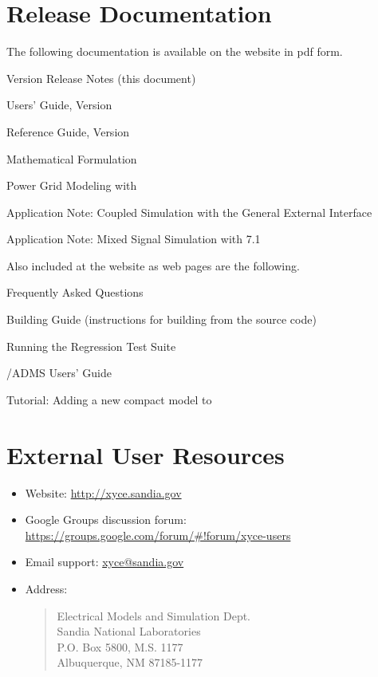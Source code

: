 \documentclass[letterpaper]{scrartcl}
\begin{document}
\section{\Xyce{} Release \XyceVersionVar{} Documentation}
The following \Xyce{} documentation is available on the \Xyce{} website in pdf
form.
\begin{XyceItemize}
  \item \Xyce{} Version \XyceVersionVar{} Release Notes (this document)
  \item \Xyce{} Users' Guide, Version \XyceVersionVar{}
  \item \Xyce{} Reference Guide, Version \XyceVersionVar{}
  \item \Xyce{} Mathematical Formulation
  \item Power Grid Modeling with \Xyce{}
  \item Application Note: Coupled Simulation with the \Xyce{} General
    External Interface
  \item Application Note: Mixed Signal Simulation with \Xyce{} 7.1
\end{XyceItemize}
Also included at the \Xyce{} website as web pages are the following.
\begin{XyceItemize}
  \item Frequently Asked Questions
  \item Building Guide (instructions for building \Xyce{} from the source code)
  \item Running the \Xyce{} Regression Test Suite
  \item \Xyce{}/ADMS Users' Guide
  \item Tutorial:  Adding a new compact model to \Xyce{}
\end{XyceItemize}


\section{External User Resources}
\begin{itemize}
  \item Website: {\color{XyceDeepRed}\url{http://xyce.sandia.gov}}
  \item Google Groups discussion forum:
    {\color{XyceDeepRed}\url{https://groups.google.com/forum/#!forum/xyce-users}}
  \item Email support:
    {\color{XyceDeepRed}\href{mailto:xyce@sandia.gov}{xyce@sandia.gov}}
  \item Address:
    \begin{quote}
            Electrical Models and Simulation Dept.\\
            Sandia National Laboratories\\
            P.O. Box 5800, M.S. 1177\\
            Albuquerque, NM 87185-1177 \\
    \end{quote}
\end{itemize}
\end{document}
